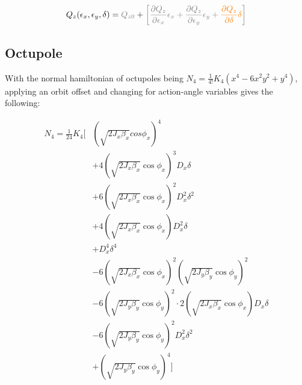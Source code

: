 \begin{equation}
\begin{aligned}
Q_z(\epsilon_x, \epsilon_y, \delta) = \color{gray}Q_{z0} &+ \color{gray}\left[\frac{\partial Q_z}{\partial \epsilon_x} \epsilon_x
                                                 + \frac{\partial Q_z}{\partial \epsilon_y} \epsilon_y
                                                 + \textcolor{orange}{\frac{\partial Q_z}{\partial \delta} \delta}
                                                \right] \\
\end{aligned}
\end{equation}



\subsection{Octupole}\label{octupole-2}

With the normal hamiltonian of octupoles being
$N_4 = \frac{1}{4!}K_{4} \left(x^{4} - 6 x^{2} y^{2} + y^{4}\right)$, applying an orbit offset and
changing for action-angle variables gives the following:

\begin{equation}
\begin{aligned}
N_4 = \frac{1}{24} K_4 \biggl[& \left(\sqrt{2J_x\beta_x} cos\phi_x\right)^4 \\
                                        & +4 \left(\sqrt{2 J_x \beta_x} \cos \phi_x\right)^3 D_x \delta \\
                                        & +6 \left(\sqrt{2 J_x \beta_x} \cos \phi_x\right)^2 D_x^2 \delta^2 \\
                                        & +4 \left(\sqrt{2 J_x \beta_x} \cos \phi_x\right) D_x^2 \delta \\
                                        & +D_x^4 \delta^4 \\
                                        & -6 \left(\sqrt{2 J_x \beta_x} \cos \phi_x\right)^2 \left(\sqrt{2 J_y \beta_y}\cos \phi_y\right)^2\\
                                        & -6 \left(\sqrt{2 J_y \beta_y} \cos \phi_y\right)^2 \cdot 2 \left(\sqrt{2 J_x \beta_x}\cos \phi_x\right) D_x \delta \\
                                        & -6 \left(\sqrt{2 J_y \beta_y} \cos \phi_y\right)^2 D_x^2 \delta^2 \\
                                        & + \left(\sqrt{2 J_y \beta_y} \cos \phi_y\right)^4
                                  \biggr]\\
\end{aligned}
\end{equation}

